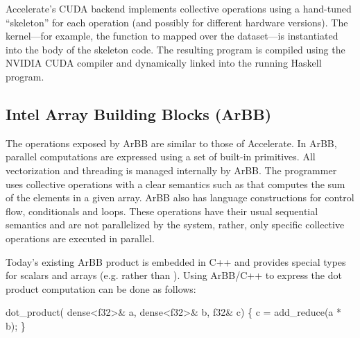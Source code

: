 Accelerate's CUDA backend implements collective operations using
a hand-tuned ``skeleton'' for each operation (and possibly for
different hardware versions). The kernel---for example, the function
to mapped over the dataset---is 
instantiated into the body of the skeleton code. The resulting 
program is compiled using the NVIDIA CUDA compiler and dynamically linked 
into the running Haskell program.

\subsection{Intel Array Building Blocks (ArBB)}
\label{sec:arbb}

The operations exposed by ArBB are similar to those of Accelerate. 
In ArBB, parallel computations are expressed using a set of built-in 
primitives. All vectorization and threading is managed internally by 
ArBB. The programmer uses collective operations with a clear semantics 
such as  that computes the sum of the elements in a given 
array. ArBB also has language constructions for control flow, conditionals
and loops. These operations have their usual sequential semantics and are not 
parallelized by the system, rather, only specific collective operations are executed
in parallel. 

Today's existing ArBB product is embedded in C++ and provides special
types for scalars and arrays (e.g.  rather than ).
Using ArBB/C++ to express the dot product computation can be done 
as follows:

\begin{code}
 dot\_product( dense<f32>& a, 
                  dense<f32>& b,
                 f32& c) 
\{ 
  c = add\_reduce(a * b);
\}
\end{code} 




